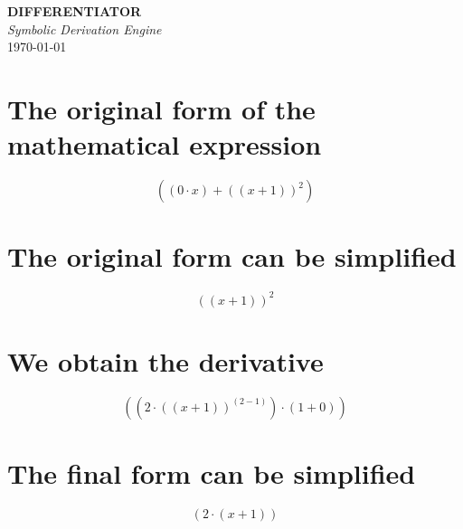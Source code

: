 \documentclass[12pt, letterpaper, twoside]{article}
\begin{document}
\begin{titlepage}
  \centering
  \vspace*{0.25\textheight}
  {\fontsize{48}{60}\bfseries\color{accent}DIFFERENTIATOR\\}
  \vspace{1.5em}
  {\Large\itshape Symbolic Derivation Engine}\\
  \vspace{2em}
  \quad \today\\
  \vfill
\end{titlepage}
\newpage

\section{The original form of the mathematical expression}
	\[((0 \cdot x) + ((x + 1))^{2})\]
\section{The original form can be simplified}
	\[((x + 1))^{2}\]
\section{We obtain the derivative}
	\[((2 \cdot ((x + 1))^{(2 - 1)}) \cdot (1 + 0))\]
\section{The final form can be simplified}
	\[(2 \cdot (x + 1))\]
\end{document}
